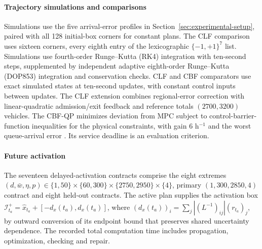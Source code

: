 \documentclass[preprint,12pt]{elsarticle}
\theoremstyle{definition}
\theoremstyle{plain}
\theoremstyle{definition}
\theoremstyle{plain}
\begin{document}
\paragraph{Trajectory simulations and comparisons}
Simulations use the five arrival-error profiles in
Section~\ref{sec:experimental-setup}, paired with all 128 initial-box
corners for constant plans. The CLF comparison uses sixteen corners,
every eighth entry of the lexicographic $\{-1,+1\}^7$ list.
Simulations use fourth-order Runge--Kutta
(RK4) integration with ten-second steps, supplemented by independent
adaptive eighth-order Runge--Kutta (DOP853) integration and conservation
checks. CLF and CBF comparators use exact simulated states at ten-second
updates, with constant control inputs between updates.
The CLF extension combines regional-error correction with
linear-quadratic admission/exit feedback and reference totals
$(2700,3200)$ vehicles. The CBF-QP minimizes deviation from
MPC subject to control-barrier-function inequalities for the physical constraints, with gain $6$ h$^{-1}$
and the worst queue-arrival error \cite{ames2017}. Its service deadline
is an evaluation criterion. 

\paragraph{Future activation}
\label{supp:detail:sec:delayed-handover-results}
\label{app:sequential-handover}
The seventeen delayed-activation contracts comprise the eight extremes
$(d,\bar w,\eta,p)\in\{1,50\}\times\{60,300\}\times
\{2750,2950\}\times\{4\}$, primary $(1,300,2850,4)$ contract and eight
held-out contracts. The active plan supplies the activation box
$\mathcal I_{t_a}^+=\widehat x_{t_a}+[-d_x(t_a),d_x(t_a)]$, where
$(d_x(t_a))_i=\sum_j|(L^{-1})_{ij}|(r_{t_a})_j$, by outward conversion of its
endpoint bound that preserves shared uncertainty dependence. The recorded total computation time includes propagation,
optimization, checking and repair.
\end{document}
